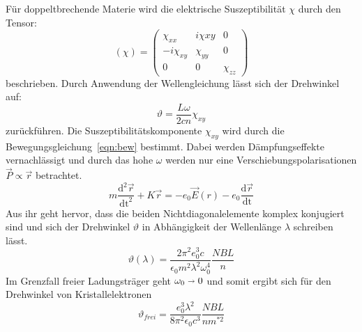 Für doppeltbrechende Materie wird die elektrische Suszeptibilität $\chi$ durch den Tensor:
\begin{equation}
  (\chi)=
  \begin{pmatrix}
    \chi_{xx} & i\chi{xy} & 0\\
    -i\chi_{xy} & \chi_{yy} & 0\\
    0 & 0 & \chi_{zz}
  \end{pmatrix}
\end{equation}
beschrieben. Durch Anwendung der Wellengleichung lässt sich der Drehwinkel auf:
\begin{equation}
  \vartheta = \frac{L\omega}{2cn}\chi_{xy}
\end{equation}
zurückführen. Die Suszeptibilitätskomponente $\chi_{xy}$ wird durch die Bewegungsgleichung~\ref{eqn:bew} bestimmt. Dabei werden Dämpfungseffekte
vernachlässigt und durch das hohe $\omega$ werden nur eine Verschiebungspolarisationen $\vec{P} \propto \vec{r}$ betrachtet.
\begin{equation}
   m \frac{\text{d}^2\vec{r}}{\text{dt}^2} + K\vec{r} = -e_0\vec{E}(r) - e_0\frac{\text{d}\vec{r}}{\text{dt}}
   \label{eqn:bew}
\end{equation}
Aus ihr geht hervor, dass die beiden Nichtdiagonalelemente komplex konjugiert sind und sich der Drehwinkel $\vartheta$ in Abhängigkeit der
Wellenlänge $\lambda$ schreiben lässt.
\begin{equation}
  \vartheta(\lambda) = \frac{2\pi^2e_0^3c}{\epsilon_0 m^2\lambda^2\omega_0^4}\frac{NBL}{n}
\end{equation}
Im Grenzfall freier Ladungsträger geht $\omega_0 \shortrightarrow 0$ und somit ergibt sich für den Drehwinkel von Kristallelektronen
\begin{equation}
  \vartheta_{frei} = \frac{e_0^3\lambda^2}{8\pi^2\epsilon_0c^3}\frac{NBL}{n m^{*2}}
  \label{eq:frei}
\end{equation}
